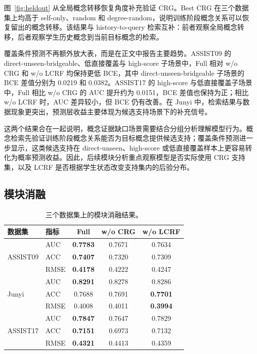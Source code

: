 \documentclass[conference]{IEEEtran}
\begin{document}
图~\ref{fig:heldout} 从全局概念转移恢复角度补充验证 CRG。Best CRG 在三个数据集上均高于 self-only、random 和 degree-random，说明训练阶段概念关系可以恢复留出的概念转移。该结果与 history-to-query 检索互补：前者观察全局概念转移，后者观察学生历史概念到当前目标概念的检索。

覆盖条件预测不再额外放大表，而是在正文中报告主要趋势。ASSIST09 的 direct-unseen-bridgeable、低直接覆盖与 high-score 子场景中，Full 相对 w/o CRG 和 w/o LCRF 均保持更低 BCE，其中 direct-unseen-bridgeable 子场景的 BCE 差值分别为 0.0219 和 0.0382。ASSIST17 的 high-score 与低直接覆盖子场景中，Full 相比 w/o CRG 的 AUC 提升约为 0.0151，BCE 差值也保持为正；相比 w/o LCRF 时，AUC 差异较小，但 BCE 仍有改善。在 Junyi 中，检索结果与数据现象更突出，预测层收益主要体现为候选支持场景下的补充信号。

这两个结果合在一起说明，概念证据缺口场景需要结合分组分析理解模型行为。概念检索先验证训练阶段概念关系能否为目标概念提供候选支持；覆盖条件预测进一步显示，这类候选支持在 direct-unseen、high-score 或低直接覆盖样本上更容易转化为概率预测收益。因此，后续模块分析重点观察模型是否实际使用 CRG 支持集，以及 LCRF 是否根据学生状态改变支持集内的后验分布。

\subsection{模块消融}
\begin{table}[H]
\centering
\caption{三个数据集上的模块消融结果。}
\label{tab:ablation}
\small
\setlength{\tabcolsep}{3.2pt}
\begin{tabular}{llccc}
\toprule
数据集 & 指标 & Full & w/o CRG & w/o LCRF\\
\midrule
\multirow{3}{*}{ASSIST09}
& AUC  & \textbf{0.7783} & 0.7671 & 0.7634\\
& ACC  & \textbf{0.7407} & 0.7320 & 0.7309\\
& RMSE & \textbf{0.4178} & 0.4222 & 0.4247\\
\midrule
\multirow{3}{*}{Junyi}
& AUC  & \textbf{0.8291} & 0.8278 & 0.8286\\
& ACC  & 0.7688 & 0.7691 & \textbf{0.7701}\\
& RMSE & 0.4008 & 0.4011 & \textbf{0.3994}\\
\midrule
\multirow{3}{*}{ASSIST17}
& AUC  & \textbf{0.7847} & 0.7647 & 0.7829\\
& ACC  & \textbf{0.7151} & 0.6973 & 0.7132\\
& RMSE & \textbf{0.4321} & 0.4413 & 0.4359\\
\bottomrule
\end{tabular}
\end{table}
\end{document}

